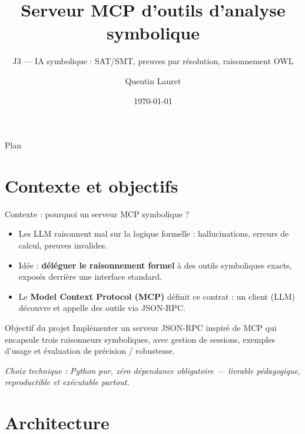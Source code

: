 \documentclass[10pt,aspectratio=169]{beamer}
\title{Serveur MCP d'outils d'analyse symbolique}
\subtitle{J3 --- IA symbolique : SAT/SMT, preuves par résolution, raisonnement OWL}
\author{Quentin Lauret}
\institute{EPITA}
\date{\today}
\begin{document}
\begin{frame}
  \titlepage
\end{frame}

\begin{frame}{Plan}
  \tableofcontents
\end{frame}

\section{Contexte et objectifs}

\begin{frame}{Contexte : pourquoi un serveur MCP symbolique ?}
  \begin{itemize}
    \item Les LLM raisonnent mal sur la logique formelle : hallucinations,
          erreurs de calcul, preuves invalides.
    \item Idée : \textbf{déléguer le raisonnement formel} à des outils
          symboliques exacts, exposés derrière une interface standard.
    \item Le \textbf{Model Context Protocol (MCP)} définit ce contrat :
          un client (LLM) découvre et appelle des outils via JSON-RPC.
  \end{itemize}
  \vfill
  \begin{block}{Objectif du projet}
    Implémenter un serveur JSON-RPC inspiré de MCP qui encapsule trois
    raisonneurs symboliques, avec gestion de sessions, exemples d'usage
    et évaluation de précision / robustesse.
  \end{block}
  \vfill
  \textit{Choix technique : Python pur, zéro dépendance obligatoire ---
  livrable pédagogique, reproductible et exécutable partout.}
\end{frame}

\section{Architecture}
\end{document}
